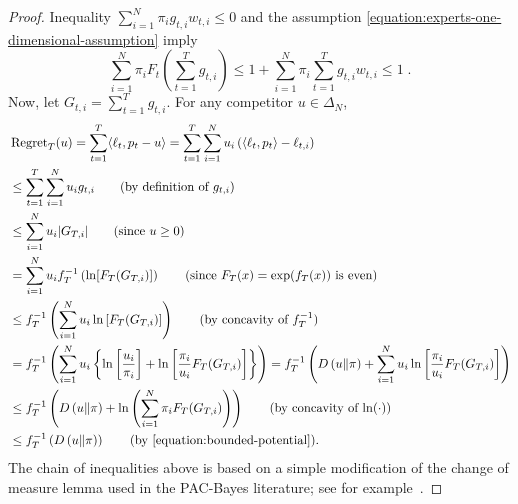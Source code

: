 \begin{proof}
Inequality $\sum_{i=1}^N \pi_i g_{t,i} w_{t,i} \le 0$ and the assumption
\eqref{equation:experts-one-dimensional-assumption} imply
\begin{equation}
\label{equation:bounded-potential}
\sum_{i=1}^N  \pi_i F_t \left(\sum_{t=1}^T g_{t,i} \right) \le 1 + \sum_{i=1}^N \pi_i \sum_{t=1}^T  g_{t,i} w_{t,i} \le 1 \; .
\end{equation}
Now, let $G_{t,i} =
\sum_{t=1}^T g_{t,i}$. For any competitor $u \in \Delta_N$,
\begingroup
\allowdisplaybreaks
\begin{align*}
\allowdisplaybreaks
&\Regret_T(u)
= \sum_{t=1}^T \langle \ell_t, p_t - u \rangle
= \sum_{t=1}^T \sum_{i=1}^N u_i \left( \langle \ell_t, p_t \rangle - \ell_{t,i} \right) \\
& \le \sum_{t=1}^T \sum_{i=1}^N u_i g_{t,i} \qquad \text{(by definition of $g_{t,i}$)} \\
& \le \sum_{i=1}^N u_i |G_{T,i}| \qquad \text{(since $u \ge 0$)}  \\
& = \sum_{i=1}^N u_i f_T^{-1}\left(\ln [F_T(G_{T,i})] \right)  \qquad \text{(since $F_T(x) = \exp(f_T(x))$ is even)} \\
& \le f_T^{-1}\left(\sum_{i=1}^N u_i \ln \left[ F_T(G_{T,i}) \right]\right) \qquad \text{(by concavity of $f_T^{-1}$)} \\
& = f_T^{-1}\left(\sum_{i=1}^N u_i \left\{\ln \left[\frac{u_i}{\pi_i}\right] +\ln \left[ \frac{\pi_i}{u_i} F_T(G_{T,i}) \right] \right\} \right)
= f_T^{-1}\left(\KL{u}{\pi}+\sum_{i=1}^N u_i\ln \left[\frac{\pi_i}{u_i} F_T(G_{T,i}) \right]\right) \\
& \le f_T^{-1}\left(\KL{u}{\pi}+\ln \left(\sum_{i=1}^N \pi_i F_T(G_{T,i}) \right)\right) \qquad \text{(by concavity of $\ln(\cdot)$)} \\
& \le f_T^{-1}\left(\KL{u}{\pi}\right) \qquad \text{(by \eqref{equation:bounded-potential})}.
\end{align*}
\endgroup
The chain of inequalities above is based on a simple modification of the change
of measure lemma used in the PAC-Bayes literature; see for
example~\citet{McAllester13}.
\end{proof}
